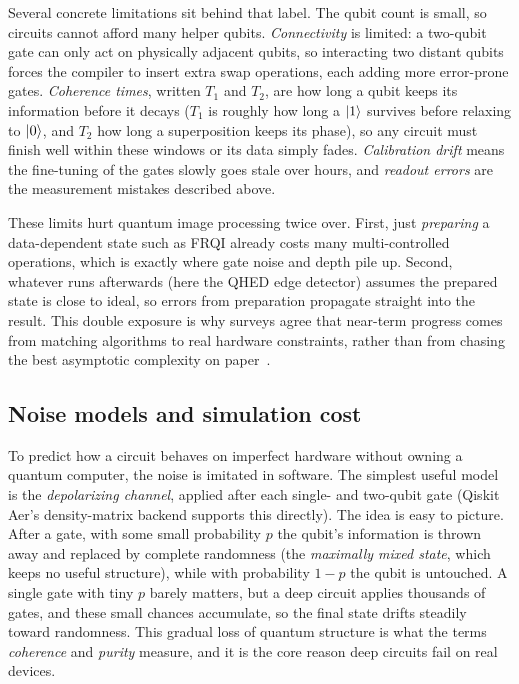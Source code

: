 Several concrete limitations sit behind that label. The qubit count is small, so circuits cannot afford many helper qubits. \emph{Connectivity} is limited: a two-qubit gate can only act on physically adjacent qubits, so interacting two distant qubits forces the compiler to insert extra swap operations, each adding more error-prone gates. \emph{Coherence times}, written $T_1$ and $T_2$, are how long a qubit keeps its information before it decays ($T_1$ is roughly how long a $\ket{1}$ survives before relaxing to $\ket{0}$, and $T_2$ how long a superposition keeps its phase), so any circuit must finish well within these windows or its data simply fades. \emph{Calibration drift} means the fine-tuning of the gates slowly goes stale over hours, and \emph{readout errors} are the measurement mistakes described above.

These limits hurt quantum image processing twice over. First, just \emph{preparing} a data-dependent state such as FRQI already costs many multi-controlled operations, which is exactly where gate noise and depth pile up. Second, whatever runs afterwards (here the QHED edge detector) assumes the prepared state is close to ideal, so errors from preparation propagate straight into the result. This double exposure is why surveys agree that near-term progress comes from matching algorithms to real hardware constraints, rather than from chasing the best asymptotic complexity on paper~\cite{Ruan2021OpportunitiesChallenges,Farooq2025SystematicReview}.

\subsection{Noise models and simulation cost}
To predict how a circuit behaves on imperfect hardware without owning a quantum computer, the noise is imitated in software. The simplest useful model is the \emph{depolarizing channel}, applied after each single- and two-qubit gate (Qiskit Aer's density-matrix backend supports this directly). The idea is easy to picture. After a gate, with some small probability $p$ the qubit's information is thrown away and replaced by complete randomness (the \emph{maximally mixed state}, which keeps no useful structure), while with probability $1-p$ the qubit is untouched. A single gate with tiny $p$ barely matters, but a deep circuit applies thousands of gates, and these small chances accumulate, so the final state drifts steadily toward randomness. This gradual loss of quantum structure is what the terms \emph{coherence} and \emph{purity} measure, and it is the core reason deep circuits fail on real devices.

